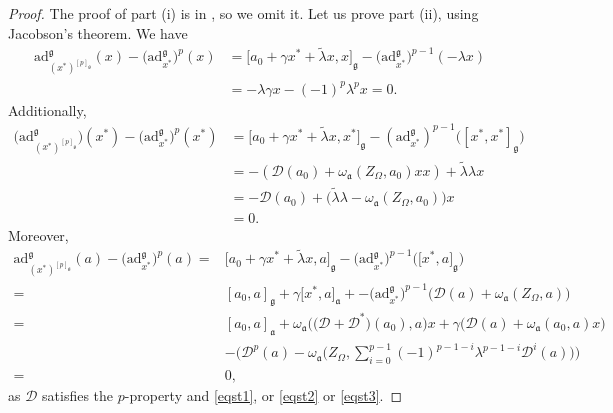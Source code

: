 \documentclass[pdftex]{sigma}
\numberwithin{equation}{section}
\begin{document}
\begin{proof} The proof of part (i) is in \cite{BM}, so we omit it. Let us prove part (ii), using Jacobson's theorem. We have
\begin{align*}
\mathrm{ad}_{(x^*)^{[p]_\mathfrak{g}}}^\mathfrak{g}(x)-\bigl(\mathrm{ad}_{x^*}^\mathfrak{g}\bigr)^p(x) &= \big[a_0+\gamma x^*+\tilde \lambda x,x\big]_\mathfrak{g}-\bigl(\mathrm{ad}_{x^*}^\mathfrak{g}\bigr)^{p-1}(-\lambda x)\\
 &= -\lambda \gamma x-(-1)^p \lambda^px=0.
\end{align*}
Additionally,
\begin{align*}
\bigl(\mathrm{ad}_{(x^*)^{[p]_\mathfrak{g}}}^\mathfrak{g}\bigr)(x^*)-\bigl(\mathrm{ad}_{x^*}^\mathfrak{g}\bigr)^p(x^*) &= \big[a_0+\gamma x^*+\tilde \lambda x,x^*\big]_\mathfrak{g}-(\mathrm{ad}_{x^*}^\mathfrak{g})^{p-1}\bigl([x^*,x^*]_\mathfrak{g}\bigr)\\
 &= -(\mathscr{D}(a_0)+\omega_\mathfrak{a}(Z_\Omega,a_0)xx)+\tilde \lambda \lambda x\\
 &= -\mathscr{D}(a_0)+\bigl(\tilde \lambda \lambda-\omega_\mathfrak{a}(Z_\Omega,a_0)\bigr)x\\
 &=0.
\end{align*}
Moreover,
\begin{align*}
\mathrm{ad}_{(x^*)^{[p]_\mathfrak{g}}}^\mathfrak{g}(a)-\bigl(\mathrm{ad}_{x^*}^\mathfrak{g}\bigr)^p(a) ={}& \big[a_0+\gamma x^*+\tilde \lambda x,a\big]_\mathfrak{g}-\bigl(\mathrm{ad}_{x^*}^\mathfrak{g}\bigr)^{p-1}\bigl(\big[x^*,a\big]_\mathfrak{g}\bigr)\\
={}& [a_0,a]_\mathfrak{g}+\gamma\big[ x^*,a\big]_\mathfrak{a}+-\bigl(\mathrm{ad}_{x^*}^\mathfrak{g}\bigr)^{p-1}\bigl(\mathscr{D}(a)+\omega_\mathfrak{a}(Z_\Omega,a)\bigr)\\
={}& [a_0,a]_\mathfrak{a}+\omega_\mathfrak{a}\bigl(\bigl({\mathscr D}+{\mathscr D}^*\bigr)(a_0),a\bigr)x+\gamma\bigl({\mathscr D} (a)+ \omega_\mathfrak{a}(a_0,a)x\bigr)\\
&- \bigg(\mathscr{D}^p(a)- \omega_\mathfrak{a}\bigg( Z_\Omega, \sum_{i=0}^{p-1} (-1)^{p-1-i}\lambda^{p-1-i} {\mathscr D}^i(a)\bigg)\bigg)\\
={}&0,
\end{align*}
as ${\mathscr D}$ satisfies the $p$-property and \eqref{eqst1}, or \eqref{eqst2} or \eqref{eqst3}.


\end{proof}
\end{document}
